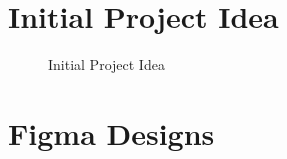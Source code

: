 \section{Initial Project Idea}\label{appendix:initIdea}
\begin{figure}[!htbp]
    \centering
    \noindent\begin{subfigure}[b]{\textwidth}
        \centering
    \end{subfigure}
\caption{Initial Project Idea}
\end{figure}
\FloatBarrier
\newpage


\section{Figma Designs}\label{appendix:figmaScreens}
